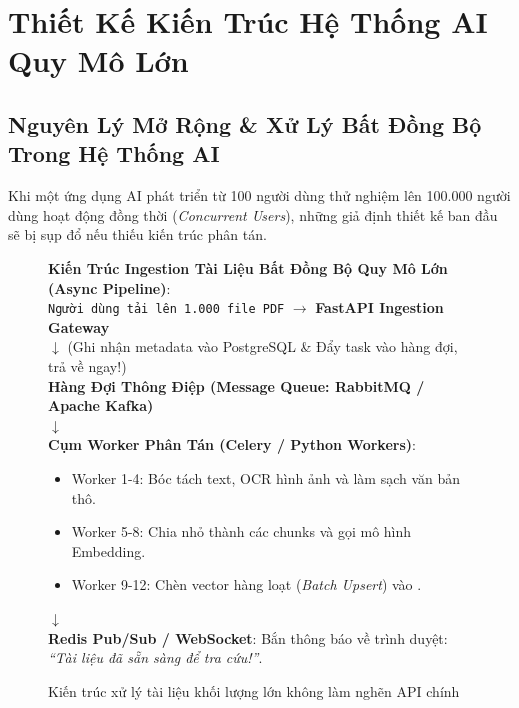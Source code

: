 
\chapter{Thiết Kế Kiến Trúc Hệ Thống AI Quy Mô Lớn}
\label{ch:phase7-system-design}

\section{Nguyên Lý Mở Rộng \& Xử Lý Bất Đồng Bộ Trong Hệ Thống AI}
\label{sec:sysdes-scalability}

Khi một ứng dụng AI phát triển từ 100 người dùng thử nghiệm lên 100.000 người dùng hoạt động đồng thời (\textit{Concurrent Users}), những giả định thiết kế ban đầu sẽ bị sụp đổ nếu thiếu kiến trúc phân tán.

\begin{figure}[htbp]
\centering
\begin{tcolorbox}[colback=boxbg,colframe=primarycolor,width=0.95\textwidth,arc=2pt]
\small
\textbf{Kiến Trúc Ingestion Tài Liệu Bất Đồng Bộ Quy Mô Lớn (Async Pipeline)}:\\[0.2cm]
\texttt{Người dùng tải lên 1.000 file PDF} $\longrightarrow$ \textbf{FastAPI Ingestion Gateway}\\
$\downarrow$ (Ghi nhận metadata vào PostgreSQL \& Đẩy task vào hàng đợi, trả về  ngay!)\\
\textbf{Hàng Đợi Thông Điệp (Message Queue: RabbitMQ / Apache Kafka)}\\
$\downarrow$\\
\textbf{Cụm Worker Phân Tán (Celery / Python Workers)}:
\begin{itemize}
  \item Worker 1-4: Bóc tách text, OCR hình ảnh và làm sạch văn bản thô.
  \item Worker 5-8: Chia nhỏ thành các chunks và gọi mô hình Embedding.
  \item Worker 9-12: Chèn vector hàng loạt (\textit{Batch Upsert}) vào .
\end{itemize}
$\downarrow$\\
\textbf{Redis Pub/Sub / WebSocket}: Bắn thông báo về trình duyệt: \textit{``Tài liệu đã sẵn sàng để tra cứu!''}.
\end{tcolorbox}
\caption{Kiến trúc xử lý tài liệu khối lượng lớn không làm nghẽn API chính}
\label{fig:async-ingestion-arch}
\end{figure}

